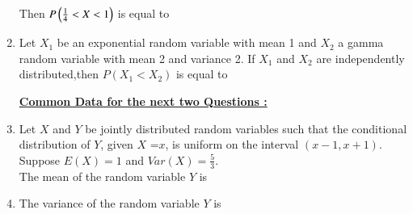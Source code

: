\begin{enumerate}[label=\thesection.\arabic*.,ref=\thesection.\theenumi]
\begin{center}
\end{center}
Then $P\left(\frac{1}{4}<X<1\right)$ is equal to \underline{\hspace{3cm}}
\\
\solution




\item Let $X_1$ be an exponential random variable with mean 1 and $X_2$ a gamma random variable with mean 2 and variance 2. If $X_1$ and $X_2$ are independently distributed,then $P(X_1<X_2)$ is equal to \underline{\hspace{3cm}}
\\
\solution

\begin{center}
\centering\underline{\textbf{Common Data for the next two Questions :}}
\end{center}

\item 
Let $X$ and $Y$ be jointly distributed random variables such that the conditional distribution of $Y$, given $X$ =$x$, is uniform on the interval $(x-1,x+1)$. Suppose $E(X)=1$ and $Var(X)=\frac{5}{3}$.
\\
The mean of the random variable $Y$ is 
\begin{enumerate}
\end{enumerate}
\solution

\item The variance of the random variable $Y$ is 
\\
\begin{enumerate}
\end{enumerate}
\end{enumerate}
